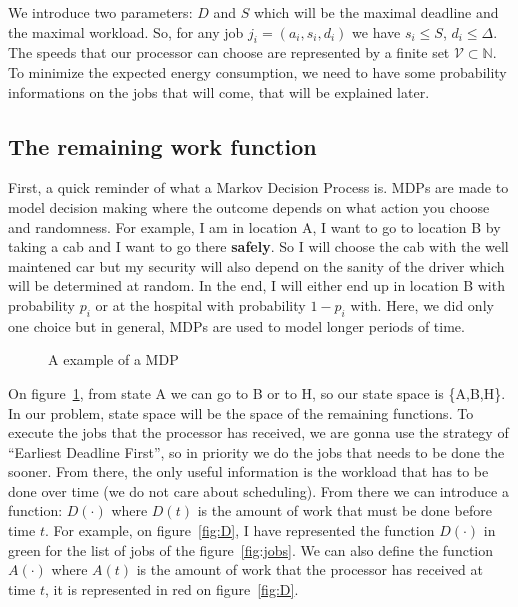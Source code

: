 \documentclass[
10pt, %
a4paper, %
oneside, %
headinclude,footinclude, %
BCOR5mm, %
]{scrartcl}
\newcommand{\N}{\mathbb{N}}
\newcommand{\V}{\mathcal{V}}
\begin{document}
We introduce two parameters: $D$ and $S$ which will be the maximal
deadline and the maximal workload. So, for any job
$j_i=(a_i,s_i,d_i)$ we have $s_i\leq S$, $d_i\leq \Delta$.
The speeds that our processor can choose are represented by a finite
set $\V\subset\N$. To minimize the expected energy consumption, we
need to have some probability informations on the jobs that will
come, that will be explained later.

\subsection{The remaining work function}
First, a quick reminder of what a Markov Decision Process is. MDPs are
made to model decision making where the outcome depends on what action
you choose and randomness. For example, I am in location A, I want to
go to location B by taking a cab and I want to go there
\textbf{safely}. So I will choose the cab with the well maintened car
but my security will also depend on the sanity of the driver which
will be determined at random. In the end, I will either end up in
location B with probability $p_i$ or at the hospital with probability
$1-p_i$ with. Here, we did only one choice but in general, MDPs are
used to model longer periods of time.\\

\begin{figure}
  \centering
 \caption{A example of a MDP}
  \label{fig:mdp}
\end{figure}

On figure~\ref{fig:mdp}, from state A we can go to B or to H, so our state
space is \{A,B,H\}. In our problem, state space will be the space of
the remaining functions. To execute the jobs that the processor has
received, we are gonna use the strategy of ``Earliest Deadline
First'', so in priority we do the jobs that needs to be done the
sooner. From there, the only useful information is the workload that
has to be done over time (we do not care about scheduling). From there
we can introduce a function: $D(\cdot)$ where $D(t)$ is the amount of
work that must be done before time $t$. For example, on
figure~\ref{fig:D}, I have represented the function $D(\cdot)$ in
green for the list of jobs of the figure~\ref{fig:jobs}. We can also
define the function $A(\cdot)$ where $A(t)$ is the amount of work that
the processor has received at time $t$, it is represented in red on
figure~\ref{fig:D}.
\end{document}
